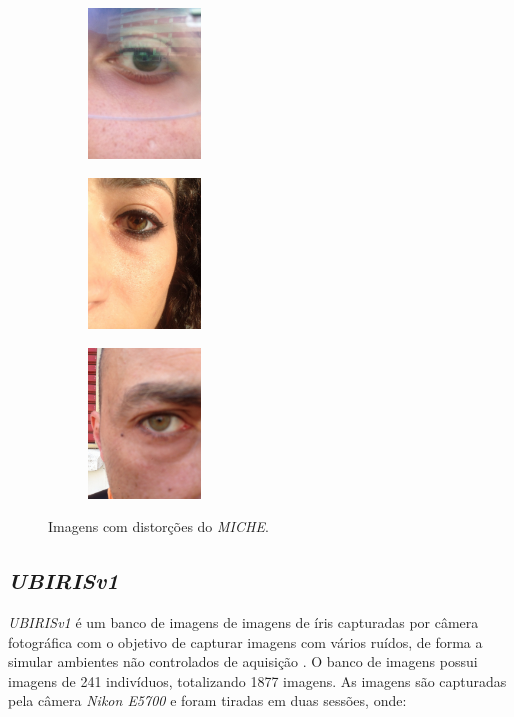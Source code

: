 \begin{figure}[h!]
\begin{subfigure}{.3\textwidth}
\centering
\includegraphics[width=3cm,height=4cm]{img/Resultados/miche/oculos.jpg}
\end{subfigure}\hfill
\begin{subfigure}{.3\textwidth}
\centering
\includegraphics[width=3cm,height=4cm]{img/Resultados/miche/cabelo.jpg}
\end{subfigure}\hfill
\begin{subfigure}{.3\textwidth}
\centering
\includegraphics[width=3cm,height=4cm]{img/Resultados/miche/ruidosa_funda.jpg}
\end{subfigure}
\caption{Imagens com distorções do \textit{MICHE}.}
\label{fig:experimentos:miche_ruim}
\end{figure}

\FloatBarrier

\subsection{\textit{UBIRISv1}}\label{sec:experimentos:db:ubirisv1}

\par \textit{UBIRISv1} é um banco de imagens de imagens de íris capturadas por câmera fotográfica com o objetivo de capturar imagens com vários ruídos, de forma a simular ambientes não controlados de aquisição \cite{proenca2005-ubirisv1, ubirisv1}. O banco de imagens possui imagens de 241 indivíduos, totalizando 1877 imagens. As imagens são capturadas pela câmera \textit{Nikon E5700} e foram tiradas em duas sessões, onde:

